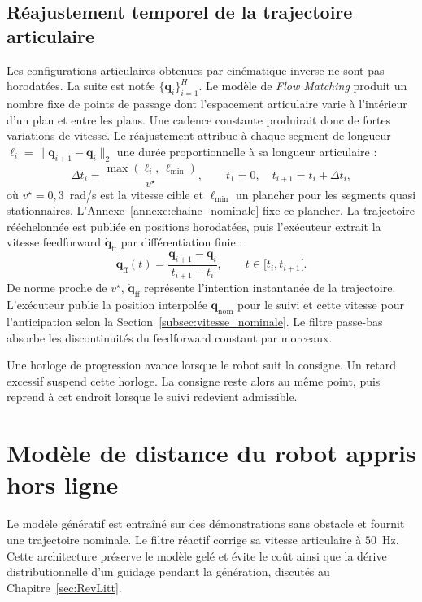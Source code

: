 \subsection{Réajustement temporel de la trajectoire articulaire}\label{subsec:dqff}
Les configurations articulaires obtenues par cinématique inverse ne sont pas horodatées. La suite est notée $\{\mathbf{q}_i\}_{i=1}^{H}$. Le modèle de \textit{Flow Matching} produit un nombre fixe de points de passage dont l'espacement articulaire varie à l'intérieur d'un plan et entre les plans. Une cadence constante produirait donc de fortes variations de vitesse. Le réajustement attribue à chaque segment de longueur $\ell_i = \|\mathbf{q}_{i+1}-\mathbf{q}_i\|_2$ une durée proportionnelle à sa longueur articulaire :
\begin{equation}\label{eq:retime_duration}
  \Delta t_i = \frac{\max(\ell_i,\,\ell_{\min})}{v^{\star}},
  \qquad
  t_1 = 0,\quad t_{i+1} = t_i + \Delta t_i,
\end{equation}
où $v^{\star}=0{,}3$~rad/s est la vitesse cible et $\ell_{\min}$ un plancher pour les segments quasi stationnaires. L'Annexe~\ref{annexe:chaine_nominale} fixe ce plancher. La trajectoire rééchelonnée est publiée en positions horodatées, puis l'exécuteur extrait la vitesse feedforward $\dot{\mathbf{q}}_{\mathrm{ff}}$ par différentiation finie :
\begin{equation}\label{eq:retime_feedforward}
  \dot{\mathbf{q}}_{\mathrm{ff}}(t) = \frac{\mathbf{q}_{i+1}-\mathbf{q}_i}{t_{i+1}-t_i},
  \qquad t \in [t_i, t_{i+1}[.
\end{equation}
De norme proche de $v^{\star}$, $\dot{\mathbf{q}}_{\mathrm{ff}}$ représente l'intention instantanée de la trajectoire. L'exécuteur publie la position interpolée $\mathbf{q}_{\mathrm{nom}}$ pour le suivi et cette vitesse pour l'anticipation selon la Section~\ref{subsec:vitesse_nominale}. Le filtre passe-bas absorbe les discontinuités du feedforward constant par morceaux.

Une horloge de progression avance lorsque le robot suit la consigne. Un retard excessif suspend cette horloge. La consigne reste alors au même point, puis reprend à cet endroit lorsque le suivi redevient admissible.
\section{Modèle de distance du robot appris hors ligne}\label{subsec:sdf_robot}
Le modèle génératif est entraîné sur des démonstrations sans obstacle et fournit une trajectoire nominale. Le filtre réactif corrige sa vitesse articulaire à $50$~Hz. Cette architecture préserve le modèle gelé et évite le coût ainsi que la dérive distributionnelle d'un guidage pendant la génération, discutés au Chapitre~\ref{sec:RevLitt}.

